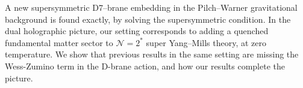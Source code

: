 A new supersymmetric D7–brane embedding in the Pilch–Warner gravitational background is found exactly, by solving the supersymmetric condition. 
In the dual holographic picture, our setting corresponds to adding a quenched fundamental matter sector to  $\mathcal{N}=2^*$  super Yang–Mills theory, at zero temperature. We show that previous results in the same setting are missing the Wess-Zumino term in the D-brane action, and how our results complete the picture.
